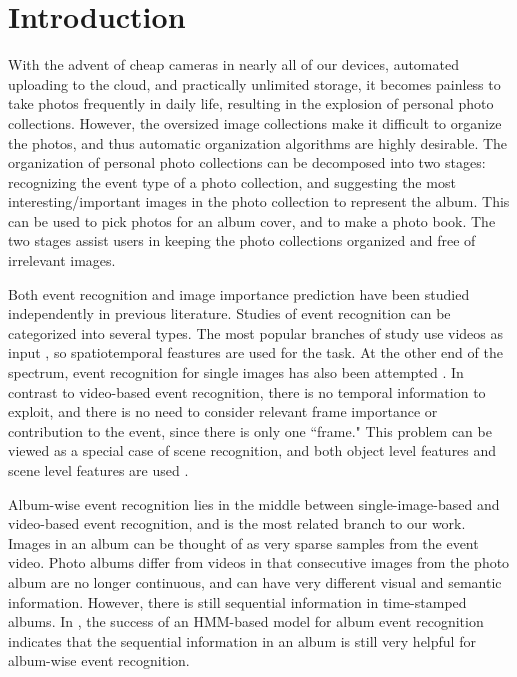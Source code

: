 \documentclass[runningheads]{llncs}
\begin{document}
\section{Introduction}
With the advent of cheap cameras in nearly all of our devices,  automated uploading to the cloud, and practically unlimited storage,
it becomes painless to take photos frequently in daily life, resulting in the explosion of personal photo collections. However, the oversized image collections make it difficult to organize the photos, and thus automatic organization algorithms are highly desirable. The organization of personal photo collections can be decomposed into two stages: recognizing the event type of a photo collection, and suggesting the most interesting/important images in the photo collection to represent the album. This can be used to pick photos for an album cover, and to make a photo book. The two stages assist users in keeping the photo collections organized and free of irrelevant images.

Both event recognition and image importance prediction have been studied independently in previous literature. Studies of event recognition can be categorized into several types. The most popular branches of study use videos as input \cite{2015trecvidover, TangCVPR12, xu2015discriminative}, so spatiotemporal feastures are used for the task. 
At the other end of the spectrum, event recognition for single images has also been attempted \cite{what_where, Park_2015_CVPR_Workshops, cSalvadora}. In contrast to video-based event recognition, there is no temporal information to exploit, and there is no need to consider relevant frame importance or contribution to the event, since there is only one ``frame." This problem can be viewed as a special case of scene recognition, and both object level features and scene level features are used \cite{what_where}. 

Album-wise event recognition lies in the middle between single-image-based and video-based event recognition, and is the most related branch to our work. Images in an album can be thought of as very sparse samples from the event video. Photo albums differ from videos in that consecutive images from the photo album are no longer continuous, and can have very different visual and semantic information. However, there is still sequential information in time-stamped albums. In \cite{HMM}, the success of an HMM-based model for album event recognition indicates that the sequential information in an album is still very helpful for  album-wise event recognition.
\end{document}
